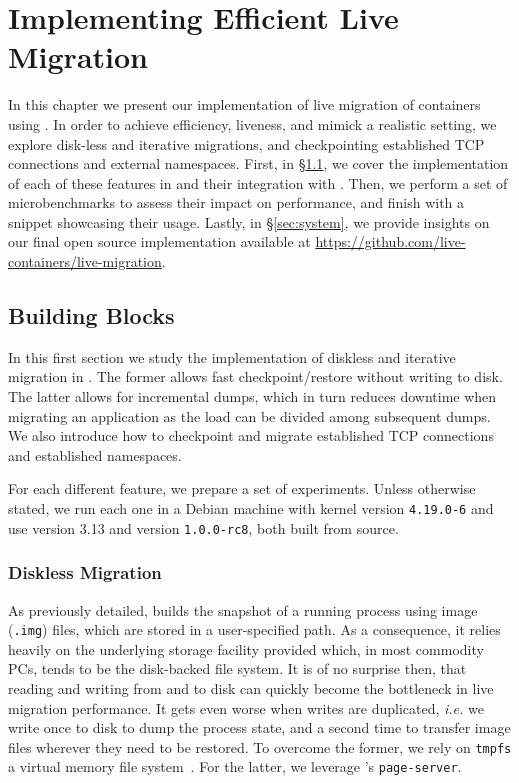 \chapter{Implementing Efficient Live Migration} \label{chap:system}

In this chapter we present our implementation of live migration of \runc containers using \criu.
In order to achieve efficiency, liveness, and mimick a realistic setting, we explore disk-less and iterative migrations, and checkpointing established TCP connections and external namespaces.
First, in \S\ref{sec:arch-blocks}, we cover the implementation of each of these features in \criu and their integration with \runc.
Then, we perform a set of microbenchmarks to assess their impact on performance, and finish with a snippet showcasing their usage.
Lastly, in \S\ref{sec:system}, we provide insights on our final open source implementation available at \url{https://github.com/live-containers/live-migration}.

\section{Building Blocks} \label{sec:arch-blocks}

In this first section we study the implementation of diskless and iterative migration in \criu.
The former allows fast checkpoint/restore without writing to disk.
The latter allows for incremental dumps, which in turn reduces downtime when migrating an application as the load can be divided among subsequent dumps.
We also introduce how to checkpoint and migrate established TCP connections and established namespaces.

For each different feature, we prepare a set of experiments.
Unless otherwise stated, we run each one in a Debian machine with kernel version \texttt{4.19.0-6} and use \criu version 3.13 and \runc version \texttt{1.0.0-rc8}, both built from source.

\subsection{Diskless Migration}

As previously detailed, \criu builds the snapshot of a running process using image (\texttt{.img}) files, which are stored in a user-specified path.
As a consequence, it relies heavily on the underlying storage facility provided which, in most commodity PCs, tends to be the disk-backed file system.
It is of no surprise then, that reading and writing from and to disk can quickly become the bottleneck in live migration performance.
It gets even worse when writes are duplicated, \textit{i.e.} we write once to disk to dump the process state, and a second time to transfer image files wherever they need to be restored.
To overcome the former, we rely on \texttt{tmpfs} a virtual memory file system~\cite{tmpfs-manpage}.
For the latter, we leverage \criu's \texttt{page-server}.

